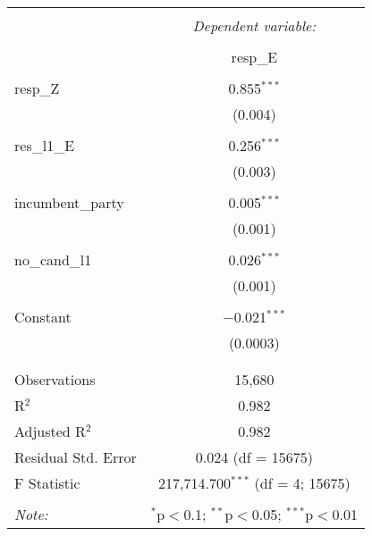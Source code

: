 
\begin{table}[!htbp] \centering 
  \caption{} 
  \label{} 
\begin{tabular}{@{\extracolsep{5pt}}lc} 
\\[-1.8ex]\hline 
\hline \\[-1.8ex] 
 & \multicolumn{1}{c}{\textit{Dependent variable:}} \\ 
\cline{2-2} 
\\[-1.8ex] & resp\_E \\ 
\hline \\[-1.8ex] 
 resp\_Z & 0.855$^{***}$ \\ 
  & (0.004) \\ 
  & \\ 
 res\_l1\_E & 0.256$^{***}$ \\ 
  & (0.003) \\ 
  & \\ 
 incumbent\_party & 0.005$^{***}$ \\ 
  & (0.001) \\ 
  & \\ 
 no\_cand\_l1 & 0.026$^{***}$ \\ 
  & (0.001) \\ 
  & \\ 
 Constant & $-$0.021$^{***}$ \\ 
  & (0.0003) \\ 
  & \\ 
\hline \\[-1.8ex] 
Observations & 15,680 \\ 
R$^{2}$ & 0.982 \\ 
Adjusted R$^{2}$ & 0.982 \\ 
Residual Std. Error & 0.024 (df = 15675) \\ 
F Statistic & 217,714.700$^{***}$ (df = 4; 15675) \\ 
\hline 
\hline \\[-1.8ex] 
\textit{Note:}  & \multicolumn{1}{r}{$^{*}$p$<$0.1; $^{**}$p$<$0.05; $^{***}$p$<$0.01} \\ 
\end{tabular} 
\end{table} 

